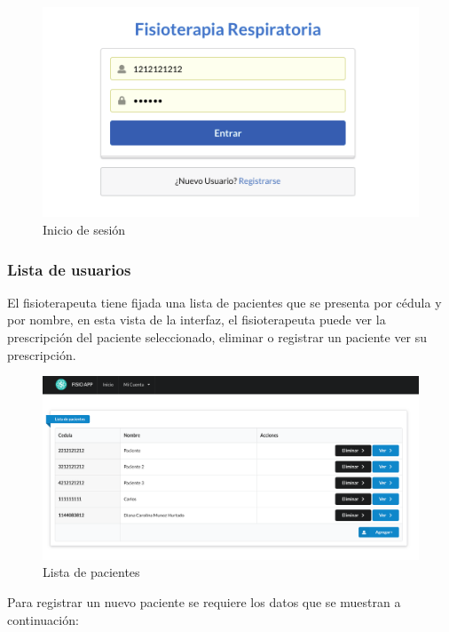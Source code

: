 \documentclass[12pt]{article}
\begin{document}
\begin{figure}[ht]
\centering
\includegraphics[scale=0.6]{imag/appiniciosesion.png}
\caption{Inicio de sesión}
\label{6}
\end{figure}
\FloatBarrier


\subsubsection{Lista de usuarios}

El fisioterapeuta tiene fijada una lista de pacientes que se presenta por cédula y por nombre, en esta vista de la interfaz, el fisioterapeuta puede ver la prescripción del paciente seleccionado, eliminar o registrar un paciente ver su prescripción.

\begin{figure}[ht]
\centering
\includegraphics[scale=0.3]{imag/listpacientes.png}
\caption{Lista de pacientes}
\label{6}
\end{figure}
\FloatBarrier

Para registrar un nuevo paciente se requiere los datos que se muestran a continuación:
\end{document}
